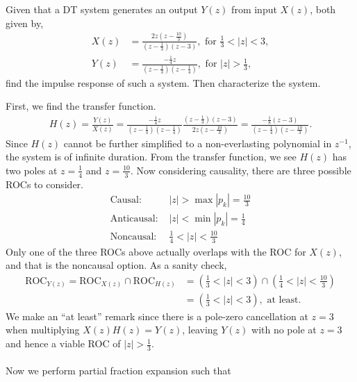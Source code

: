 \documentclass{report}
\begin{document}
\pagebreak
\begin{example}
    Given that a DT system generates an output $Y(z)$ from input $X(z)$, both given by, 
    \begin{align*}
        X(z) &= \frac{2z(z-\frac{10}{3})}{(z-\frac{1}{3})(z-3)}, \text{ for } \frac{1}{3}<|z|< 3, \\
        Y(z) &= \frac{-\frac{1}{4}z}{(z-\frac{1}{3})(z-\frac{1}{4})}, \text{ for } |z|>\frac{1}{3},
    \end{align*}
    find the impulse response of such a system. Then characterize the system.
\end{example}
\begin{solution}
    First, we find the transfer function.
    \begin{align*}
        H(z) = \frac{Y(z)}{X(z)} = \frac{-\frac{1}{4}z}{(z-\frac{1}{3})(z-\frac{1}{4})} \frac{(z-\frac{1}{3})(z-3)}{2z(z-\frac{10}{3})} = \frac{-\frac{1}{8}(z-3)}{(z-\frac{1}{4})(z-\frac{10}{3})}.
    \end{align*}
    Since $H(z)$ cannot be further simplified to a non-everlasting polynomial in $z^{-1}$, the system is of infinite duration. From the transfer function, we see $H(z)$ has two poles 
    at $z=\frac{1}{4}$ and $z=\frac{10}{3}$. Now considering causality, there are three possible ROCs to consider.
    \begin{align*}
        \text{Causal: } & |z| > \max|p_k| = \frac{10}{3} \\
        \text{Anticausal: } & |z| < \min|p_k| = \frac{1}{4} \\
        \text{Noncausal: } & \frac{1}{4} < |z| < \frac{10}{3}
    \end{align*}
    Only one of the three ROCs above actually overlaps with the ROC for $X(z)$, and that is the noncausal option. As a sanity check,
    \begin{align*}
        \text{ROC}_{Y(z)} = \text{ROC}_{X(z)} \cap \text{ROC}_{H(z)} &= \left(\frac{1}{3}<|z|< 3\right) \cap \left(\frac{1}{4}<|z|<\frac{10}{3}\right) \\
        &= \left(\frac{1}{3}<|z|< 3\right), \text{ at least.}
    \end{align*}
    We make an ``at least'' remark since there is a pole-zero cancellation at $z=3$ when multiplying $X(z)H(z)=Y(z)$, leaving $Y(z)$ with no pole at $z=3$ and hence a viable ROC of $|z|>\frac{1}{3}$.
    \\ \\
    Now we perform partial fraction expansion such that
    \begin{align*}

\end{align*}
\end{solution}
\end{document}
